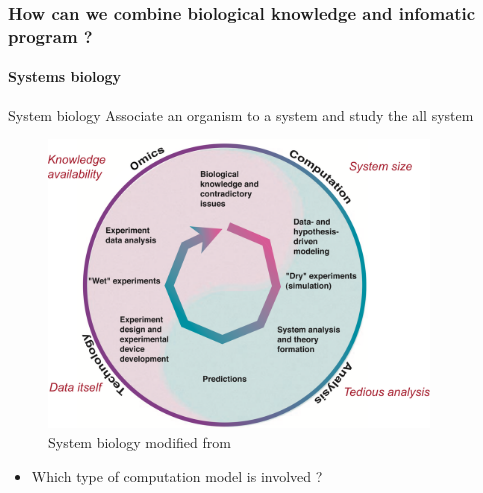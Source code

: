 \documentclass[8pt,usenames,dvipsnames]{beamer}
\begin{document}
\begin{frame}
\frametitle{How can we combine biological knowledge and infomatic program ?}
\framesubtitle{Systems biology}
\begin{exampleblock}{System biology}
Associate an organism to a system and study the all system \tiny \citep{Kitano2002}
\end{exampleblock}
\begin{minipage}{0.8\textwidth}
\begin{figure}
\includegraphics[width=0.9\textwidth]{figures/systeme-biology.pdf}
\caption{System biology modified from \cite{Kitano2002}}
\end{figure}
\end{minipage}%
\hspace{-1.1cm}%
\begin{minipage}{0.3\textwidth}
\begin{block}{}
\begin{itemize}
\item Which type of computation model is involved ?
\end{itemize}
\end{block}
\end{minipage}
\end{frame}
\end{document}
